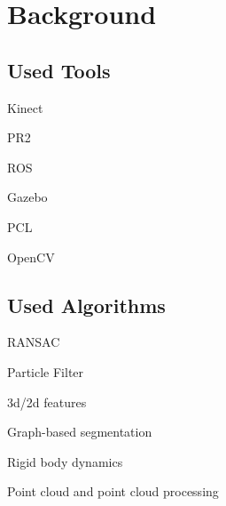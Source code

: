 \chapter{Background}
\label{chapter:Background}

\section{Used Tools}
\item Kinect
\item PR2
\item ROS
\item Gazebo
\item PCL
\item OpenCV

\section{Used Algorithms}
\item RANSAC
\item Particle Filter
\item 3d/2d features
\item Graph-based segmentation
\item Rigid body dynamics
\item Point cloud and point cloud processing



